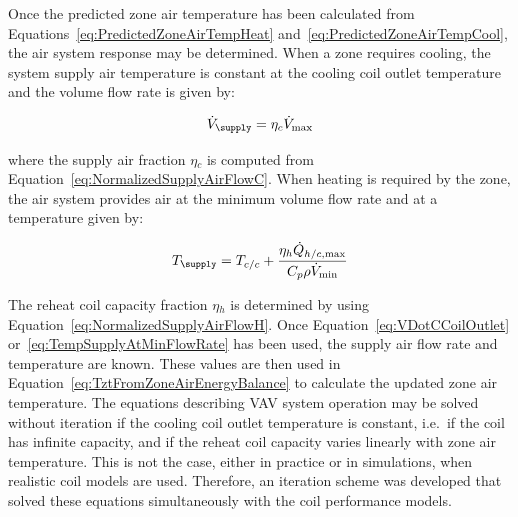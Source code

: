 Once the predicted zone air temperature has been calculated from Equations~\ref{eq:PredictedZoneAirTempHeat} and~\ref{eq:PredictedZoneAirTempCool}, the air system response may be determined. When a zone requires cooling, the system supply air temperature is constant at the cooling coil outlet temperature and the volume flow rate is given by:

\begin{equation}
{\dot V_{\supply}} = {\eta_c}{\dot V_{\max }}
\label{eq:VDotCCoilOutlet}
\end{equation}

where the supply air fraction $\eta$\(_{c}\) is computed from Equation~\ref{eq:NormalizedSupplyAirFlowC}. When heating is required by the zone, the air system provides air at the minimum volume flow rate and at a temperature given by:

\begin{equation}
{T_{\supply}} = {T_{c/c}} + \frac{{{\eta_h}{{\dot Q}_{h/c,\max }}}}{{{C_p}\rho {{\dot V}_{\min }}}}
\label{eq:TempSupplyAtMinFlowRate}
\end{equation}

The reheat coil capacity fraction $\eta$\(_{h}\) is determined by using Equation~\ref{eq:NormalizedSupplyAirFlowH}. Once Equation~\ref{eq:VDotCCoilOutlet} or~\ref{eq:TempSupplyAtMinFlowRate} has been used, the supply air flow rate and temperature are known. These values are then used in Equation~\ref{eq:TztFromZoneAirEnergyBalance} to calculate the updated zone air temperature. The equations describing VAV system operation may be solved without iteration if the cooling coil outlet temperature is constant, i.e.~if the coil has infinite capacity, and if the reheat coil capacity varies linearly with zone air temperature. This is not the case, either in practice or in simulations, when realistic coil models are used. Therefore, an iteration scheme was developed that solved these equations simultaneously with the coil performance models.
